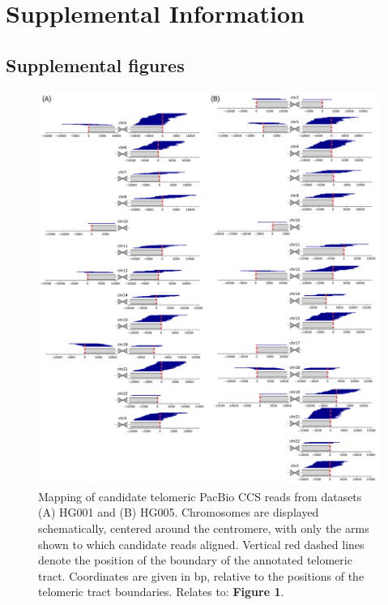 \documentclass{article}
\newcommand{\beginsupplement}{
    \pagenumbering{gobble}
    \setcounter{table}{0}
    \renewcommand{\thetable}{S\arabic{table}}
    \setcounter{figure}{0}
    \renewcommand{\thefigure}{S\arabic{figure}}
 }
\begin{document}
\beginsupplement

\section*{Supplemental Information}

\subsection*{Supplemental figures}  \label{sec:supp_figs}

\begin{figure}[ht!] \centering
\includegraphics[height=.65\textheight,width=\textwidth,keepaspectratio]{figures/HG00X-alignments.pdf}
\caption{
    Mapping of candidate telomeric PacBio CCS reads from datasets (A) HG001 and (B) HG005.
    Chromosomes are displayed schematically, centered around the centromere, with only the arms shown to which candidate reads aligned.
    Vertical red dashed lines denote the position of the boundary of the annotated telomeric tract.
    Coordinates are given in bp, relative to the positions of the telomeric tract boundaries.
    Relates to: \textbf{Figure 1}.
}
\label{fig:hg00x_alignments}
\end{figure}
\clearpage \pagebreak
\end{document}
